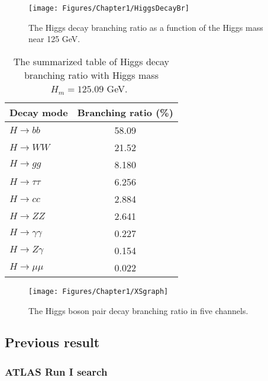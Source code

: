 \begin{figure}[h]
  \centering
  \texttt{[image: Figures/Chapter1/HiggsDecayBr]}
  \caption{The Higgs decay branching ratio as a function of the Higgs mass near 125 GeV.~\cite{1610.07922}}
  \label{fig:HiggsDecayBr}
\end{figure}

\begin{table}[h]
\centering
\caption{The summarized table of Higgs decay branching ratio with Higgs mass $H_{m}=125.09$ GeV.~\cite{1610.07922}}
\label{tab:SMHiggsBr}
\begin{tabular}{lc}
\hline
Decay mode                   & Branching ratio (\%) \\ \hline
$H \rightarrow bb$           & 58.09                \\
$H \rightarrow WW$           & 21.52                \\
$H \rightarrow gg$           & 8.180                \\
$H \rightarrow \tau\tau$     & 6.256                \\
$H \rightarrow cc$           & 2.884                \\
$H \rightarrow ZZ$           & 2.641                \\
$H \rightarrow \gamma\gamma$ & 0.227                \\
$H \rightarrow Z\gamma$      & 0.154                \\
$H \rightarrow \mu\mu$       & 0.022                \\ \hline
\end{tabular}
\end{table}

\begin{figure}[h]
  \centering
  \texttt{[image: Figures/Chapter1/XSgraph]}
  \caption{The Higgs boson pair decay branching ratio in five channels.}
  \label{fig:HHDecayBr}
\end{figure}

\clearpage

\subsection{Previous result} \label{sec:PreviousResult}


\subsubsection{ATLAS Run I search}

